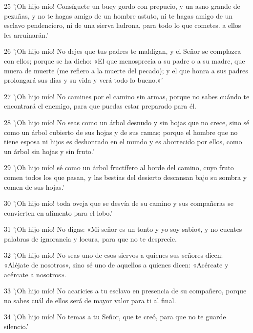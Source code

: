 \par 25 '¡Oh hijo mío! Consíguete un buey gordo con prepucio, y un asno grande de pezuñas, y no te hagas amigo de un hombre astuto, ni te hagas amigo de un esclavo pendenciero, ni de una sierva ladrona, para todo lo que cometes. a ellos les arruinarán.'

\par 26 '¡Oh hijo mío! No dejes que tus padres te maldigan, y el Señor se complazca con ellos; porque se ha dicho: «El que menosprecia a su padre o a su madre, que muera de muerte (me refiero a la muerte del pecado); y el que honra a sus padres prolongará sus días y su vida y verá todo lo bueno.»'

\par 27 '¡Oh hijo mío! No camines por el camino sin armas, porque no sabes cuándo te encontrará el enemigo, para que puedas estar preparado para él.

\par 28 '¡Oh hijo mío! No seas como un árbol desnudo y sin hojas que no crece, sino sé como un árbol cubierto de sus hojas y de sus ramas; porque el hombre que no tiene esposa ni hijos es deshonrado en el mundo y es aborrecido por ellos, como un árbol sin hojas y sin fruto.'

\par 29 '¡Oh hijo mío! sé como un árbol fructífero al borde del camino, cuyo fruto comen todos los que pasan, y las bestias del desierto descansan bajo su sombra y comen de sus hojas.'

\par 30 '¡Oh hijo mío! toda oveja que se desvía de su camino y sus compañeras se convierten en alimento para el lobo.'

\par 31 '¡Oh hijo mío! No digas: «Mi señor es un tonto y yo soy sabio», y no cuentes palabras de ignorancia y locura, para que no te desprecie.

\par 32 '¡Oh hijo mío! No seas uno de esos siervos a quienes sus señores dicen: «Aléjate de nosotros», sino sé uno de aquellos a quienes dicen: «Acércate y acércate a nosotros».

\par 33 '¡Oh hijo mío! No acaricies a tu esclavo en presencia de su compañero, porque no sabes cuál de ellos será de mayor valor para ti al final.

\par 34 '¡Oh hijo mío! No temas a tu Señor, que te creó, para que no te guarde silencio.'

